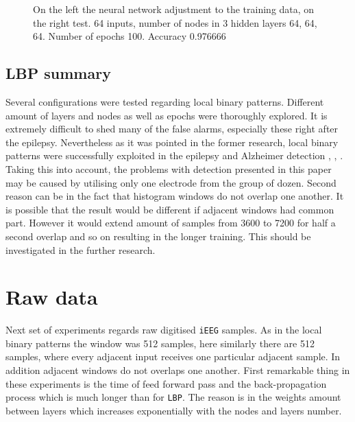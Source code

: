 \begin{figure}[H]
	\begin{center}
	\end{center}
	\caption{On the left the neural network adjustment to the training data, on the right test. 64 inputs, number of nodes in 3 hidden layers 64, 64, 64. Number of epochs 100. Accuracy \num{0.976666}}

	\label{fig:nn_lbp_3_hidden_64_64_64_64_1_100_epochs}
\end{figure}
\subsection{LBP summary}
Several configurations were tested regarding local binary patterns. Different amount of layers and nodes as well as epochs were thoroughly explored. It is extremely difficult to shed many of the false alarms, especially these right after the epilepsy. Nevertheless as it was pointed in the former research, local binary patterns were successfully exploited in the epilepsy and Alzheimer detection \cite{alzheimer}, \cite{epilepsy_short}, \cite{laelaps_long}. Taking this into account, the problems with detection presented in this paper may be caused by utilising only one electrode from the group of dozen. Second reason can be in the fact that histogram windows do not overlap one another. It is possible that the result would be different if adjacent windows had common part. However it would extend amount of samples from 3600 to 7200 for half a second overlap and so on resulting in the longer training. This should be investigated in the further research.  
\section{Raw data}
Next set of experiments regards raw digitised \verb|iEEG| samples. As in the local binary patterns the window was 512 samples, here similarly there are 512 samples, where every adjacent input receives one particular adjacent sample. In addition adjacent windows do not overlaps one another. First remarkable thing in these experiments is the time of feed forward pass and the back-propagation process which is much longer than for \verb|LBP|. The reason is in the weights amount between layers which increases exponentially with the nodes and layers number. 

